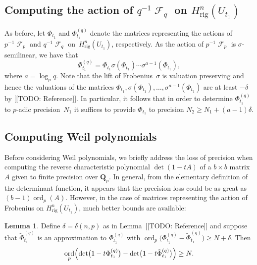 \documentclass[a4paper,11pt]{article}
\numberwithin{equation}{section}
\DeclareMathOperator{\ord}{ord}          %
\DeclareMathOperator{\Frob}{\mathcal{F}} %
\providecommand{\Hrig}{H_{\text{rig}}}  %
\theoremstyle{definition}
\newtheorem{lem}[thm]{Lemma}
\begin{document}
\subsection{Computing the action of $q^{-1} \Frob_q$ on $\Hrig^{n}(U_{t_1})$}

As before, let $\Phi_{t_1}$ and $\Phi_{t_1}^{(q)}$ denote the matrices 
representing the actions of $p^{-1} \Frob_p$ and $q^{-1} \Frob_q$ 
on~$\Hrig^{n}(U_{t_1})$, respectively.  As the action of $p^{-1} \Frob_p$ 
is $\sigma$-semilinear, we have that 
\begin{equation}
\Phi_{t_1}^{(q)} = 
    \Phi_{t_1} \sigma(\Phi_{t_1}) \dotsm \sigma^{a-1}(\Phi_{t_1}),
\end{equation}
where $a = \log_p q$.  Note that the lift of Frobenius~$\sigma$ 
is valuation preserving and hence the valuations of the matrices 
$\Phi_{t_1}, \sigma(\Phi_{t_1}), \dotsc, \sigma^{a-1}(\Phi_{t_1})$ 
are at least $-\delta$ by [[TODO: Reference]].
In particular, it follows that in order to determine $\Phi_{t_1}^{(q)}$ 
to $p$-adic precision~$N_1$ it suffices to provide $\Phi_{t_1}$ to 
precision $N_2 \geq N_1 + (a-1) \delta$.

\subsection{Computing Weil polynomials}

Before considering Weil polynomials, we briefly address the loss 
of precision when computing the reverse characteristic polynomial 
$\det(1 - t A)$ of a $b \times b$ matrix~$A$ given to finite precision 
over $\mathbf{Q}_p$.  In general, from the elementary definition of the 
determinant function, it appears that the precision loss could be as 
great as $(b-1) \ord_p(A)$.  However, in the case of matrices representing 
the action of Frobenius on $\Hrig^n(U_{t_1})$, much better bounds are 
available:

\begin{lem}
Define $\delta = \delta(n,p)$ as in Lemma~[[TODO: Reference]] and 
suppose that $\tilde{\Phi}_{t_1}^{(q)}$ is an approximation to 
$\Phi_{t_1}^{(q)}$ with 
$\ord_p\bigl(\Phi_{t_1}^{(q)}-\tilde{\Phi}_{t_1}^{(q)}\bigr) \geq N + \delta$.
Then 
\begin{equation}
\ord_p \Bigl( \det\bigl(1 - t \Phi_{t_1}^{(q)}\bigr) 
            - \det\bigl(1 - t \tilde{\Phi}_{t_1}^{(q)}\bigr) \Bigr) \geq N.
\end{equation}
\end{lem}
\end{document}
